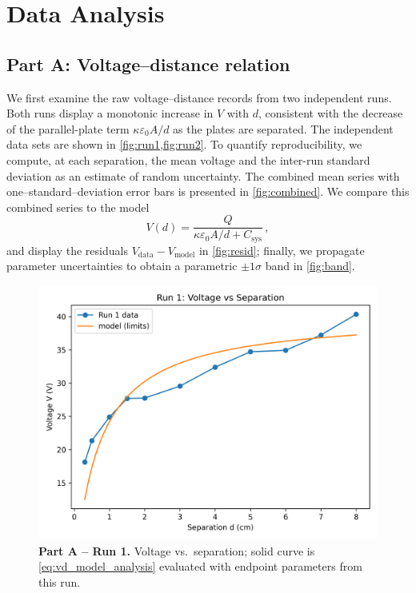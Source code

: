 \documentclass[12pt]{article}
\begin{document}
\newpage
\section{Data Analysis}

\subsection*{Part A: Voltage--distance relation}

We first examine the raw voltage--distance records from two independent runs. Both runs display a monotonic increase in \(V\) with \(d\), consistent with the decrease of the parallel-plate term \(\kappa\varepsilon_0A/d\) as the plates are separated. The independent data sets are shown in \cref{fig:run1,fig:run2}. To quantify reproducibility, we compute, at each separation, the mean voltage and the inter-run standard deviation as an estimate of random uncertainty. The combined mean series with one–standard–deviation error bars is presented in \cref{fig:combined}. We compare this combined series to the model
\begin{equation}
    V(d)=\frac{Q}{\kappa\varepsilon_0A/d + C_{\mathrm{sys}}}\,,
    \label{eq:vd_model_analysis}
\end{equation}
and display the residuals \(V_{\text{data}}-V_{\text{model}}\) in \cref{fig:resid}; finally, we propagate parameter uncertainties to obtain a parametric \(\pm1\sigma\) band in \cref{fig:band}.

\begin{figure}[htbp]
\centering
\includegraphics[width=0.82\linewidth]{PartA_Run1.png}
\caption{\textbf{Part A -- Run 1.} Voltage vs.\ separation; solid curve is \cref{eq:vd_model_analysis} evaluated with endpoint parameters from this run.}
\label{fig:run1}
\end{figure}
\FloatBarrier
\end{document}
